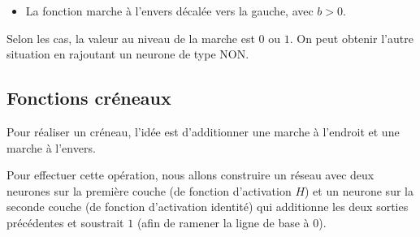 \documentclass[11pt,class=report,crop=false]{standalone}
\begin{document}
\begin{itemize}
  \item La fonction marche à l'envers décalée vers la gauche, avec $b>0$.  
  
\begin{center}
\begin{minipage}{0.35\textwidth}
\end{minipage}
\begin{minipage}{0.59\textwidth}
\end{minipage}
\end{center}   
\end{itemize}

Selon les cas, la valeur au niveau de la marche est $0$ ou $1$. On peut obtenir l'autre situation en rajoutant un neurone de type \og{}NON\fg{}.

\begin{center}
\begin{minipage}{0.35\textwidth}
\end{minipage}
\begin{minipage}{0.59\textwidth}
\end{minipage}
\end{center}  



\subsection{Fonctions créneaux}

Pour réaliser un \og{}créneau\fg{}, l'idée est d'additionner une marche à l'endroit et une marche à l'envers.


Pour effectuer cette opération, nous allons construire un réseau avec deux neurones sur la première couche (de fonction d'activation $H$) et un neurone sur la seconde couche (de fonction d'activation identité) qui additionne les deux sorties précédentes et soustrait $1$ (afin de ramener la ligne de base à $0$).

\begin{center}
\begin{minipage}{0.55\textwidth}
\end{minipage}
\begin{minipage}{0.35\textwidth}
\end{minipage}
\end{center}  
\end{document}
